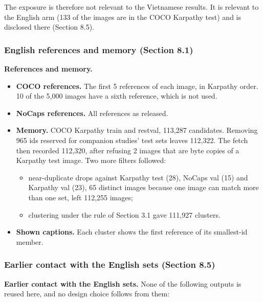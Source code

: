 The exposure is therefore not relevant to the Vietnamese results. It is relevant to the English arm
(133 of the images are in the COCO Karpathy test) and is disclosed there (Section 8.5).

\subsubsection{English references and memory (Section
8.1)}\label{english-references-and-memory-section-8.1}

\textbf{References and memory.}

\begin{itemize}
\tightlist
\item
  \textbf{COCO references.} The first 5 references of each image, in Karpathy order. 10 of the 5,000
  images have a sixth reference, which is not used.
\item
  \textbf{NoCaps references.} All references as released.
\item
  \textbf{Memory.} COCO Karpathy train and restval, 113,287 candidates. Removing 965 ids reserved
  for companion studies' test sets leaves 112,322. The fetch then recorded 112,320, after refusing 2
  images that are byte copies of a Karpathy test image. Two more filters followed:

  \begin{itemize}
  \tightlist
  \item
    near-duplicate drops against Karpathy test (28), NoCaps val (15) and Karpathy val (23), 65
    distinct images because one image can match more than one set, left 112,255 images;
  \item
    clustering under the rule of Section 3.1 gave 111,927 clusters.
  \end{itemize}
\item
  \textbf{Shown captions.} Each cluster shows the first reference of its smallest-id member.
\end{itemize}

\subsubsection{Earlier contact with the English sets (Section
8.5)}\label{earlier-contact-with-the-english-sets-section-8.5}

\textbf{Earlier contact with the English sets.} None of the following outputs is reused here, and no
design choice follows from them:

